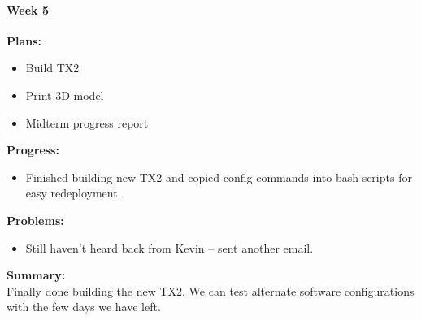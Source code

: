 \paragraph{Week 5}
\begin{adjustwidth}{2.5em}{0pt}
    \vspace{-0.5cm}\textbf{Plans:}
    \vspace{-0.5cm}
    \begin{itemize}
        \item Build TX2
        \item Print 3D model
        \item Midterm progress report
    \end{itemize} 
    \vspace{-0.3cm}\textbf{Progress:}
    \vspace{-0.5cm}
    \begin{itemize}
        \item Finished building new TX2 and copied config commands into bash scripts for easy redeployment.
    \end{itemize} 
    \vspace{-0.3cm}\textbf{Problems:}
    \vspace{-0.5cm}
    \begin{itemize}
        \item Still haven't heard back from Kevin -- sent another email.
    \end{itemize}  
    \vspace{-0.3cm}\noindent\textbf{Summary:}\\
    \noindent 
    Finally done building the new TX2. We can test alternate software configurations with the few days we have left.
\end{adjustwidth} 

